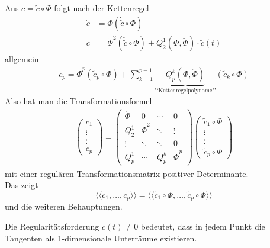 \begin{beweis}
 Aus \(c = \tilde c \circ \Phi\) folgt nach der Kettenregel
 \begin{align*}
  \dot c &= \dot \Phi \left(\dot{\tilde c} \circ \Phi \right)\\
  \ddot c &= \dot \Phi^2 \left( \ddot{\tilde c} \circ \Phi \right) + Q_2^1 \left( \dot \Phi, \ddot \Phi \right) \cdot \dot {\tilde c}(t)
 \end{align*}
allgemein 
\begin{align*}
 c_p= \dot \Phi^p (\tilde c_p \circ \Phi) + \sum_{k=1}^{p-1} \underbrace{Q_p^k \left( \dot \Phi, \ddot \Phi \right)}_{\text{"`Kettenregelpolynome"'}} \left( \tilde c_k \circ \Phi \right)
\end{align*}
Also hat man die Transformationsformel
\begin{align*}
 \begin{pmatrix}
  c_1 \\
  \vdots \\
  \vdots \\
  c_p
 \end{pmatrix} = \begin{pmatrix}
		  \dot \Phi &0 & \cdots & 0 \\
		  Q_2^1& \dot \Phi^2 & \ddots  & \vdots \\
		  \vdots & \ddots & \ddots &0 \\
		  Q_p^1 & \cdots & Q_p^k & \dot \Phi^p
		 \end{pmatrix} \begin{pmatrix}
				\tilde c_1 \circ \Phi \\
				\vdots \\
				\vdots \\
				\tilde c_p \circ \Phi
			       \end{pmatrix}
\end{align*}
mit einer regulären Transformationsmatrix positiver Determinante. \\
Das zeigt 
\[
 \langle \langle c_1, \dots, c_p \rangle \rangle = \langle \langle \tilde c_1 \circ \Phi, \dots, \tilde c_p \circ \Phi \rangle \rangle
\]
und die weiteren Behauptungen.
\end{beweis}

\begin{bemerkung}
 Die Regularitätsforderung \(\dot c(t) \ne 0\) bedeutet, dass in jedem Punkt die Tangenten als 1-dimensionale Unterräume existieren.
\end{bemerkung}

